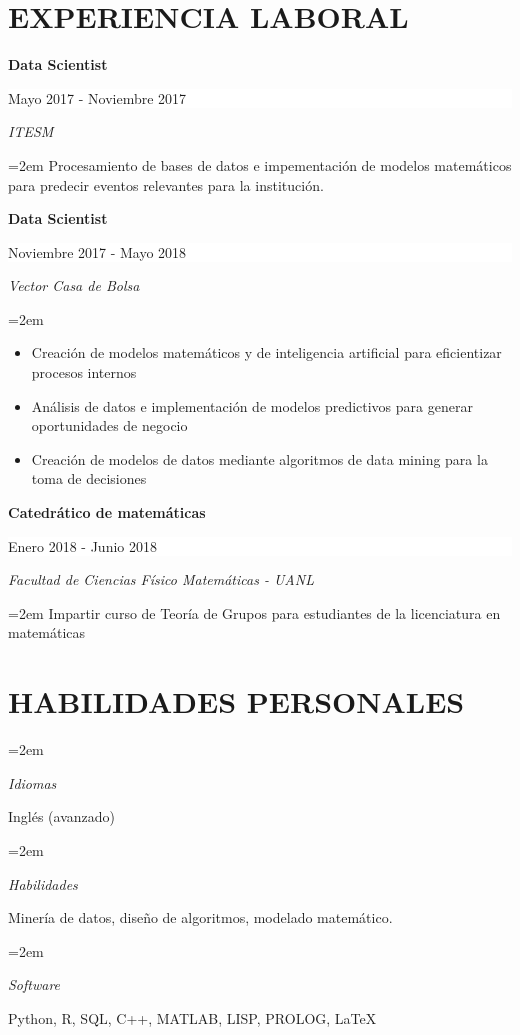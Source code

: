 \documentclass[paper=a4,fontsize=11pt]{scrartcl} %
\newlength{\spacebox}
\newcommand{\sepspace}{\vspace*{1em}}		%
\newcommand{\NewPart}[1]{\section*{\uppercase{#1}}}
\newcommand{\PersonalEntry}[2]{
		\noindent\hangindent=2em\hangafter=0 %
		\parbox{\spacebox}{        %
		\textit{#1}}		       %
		\hspace{1.5em} #2 \par}    %
\newcommand{\SkillsEntry}[2]{      %
		\noindent\hangindent=2em\hangafter=0 %
		\parbox{\spacebox}{        %
		\textit{#1}}			   %
		\hspace{1.5em} #2 \par}    %
\newcommand{\EducationEntry}[4]{
		\noindent \textbf{#1} \hfill      %
		\colorbox{White}{%
			\parbox{5cm}{%
			\hfill\color{Black}#2}} \par  %
		\noindent \textit{#3} \par        %
		\noindent\hangindent=2em\hangafter=0 \small #4 %
		\normalsize \par}
\begin{document}
\NewPart{Experiencia laboral}{}

\EducationEntry{Data Scientist}{Mayo 2017 - Noviembre 2017}{ITESM}{
Procesamiento de bases de datos e impementación de modelos matemáticos para predecir eventos relevantes para la institución.}
\sepspace

\EducationEntry{Data Scientist}{Noviembre 2017 - Mayo 2018}{Vector Casa de Bolsa}{\begin{itemize}
\item{Creación de modelos matemáticos y de inteligencia artificial para eficientizar procesos internos}
\item{Análisis de datos e implementación de modelos predictivos para generar oportunidades de negocio}
\item{Creación de modelos de datos mediante algoritmos de data mining para la toma de decisiones}
\end{itemize}}

\sepspace

\EducationEntry{Catedrático de matemáticas}{Enero 2018 - Junio 2018}{Facultad de Ciencias Físico Matemáticas - UANL}{Impartir curso de Teoría de Grupos  para estudiantes de la licenciatura en matemáticas}

\NewPart{Habilidades personales}{}

\SkillsEntry{Idiomas}{Inglés (avanzado)}
\SkillsEntry{Habilidades}{Minería de datos, diseño de algoritmos,  modelado matemático.}

\SkillsEntry{Software}{Python, R, SQL, C++, MATLAB, LISP, PROLOG,  LaTeX}




\end{document}
